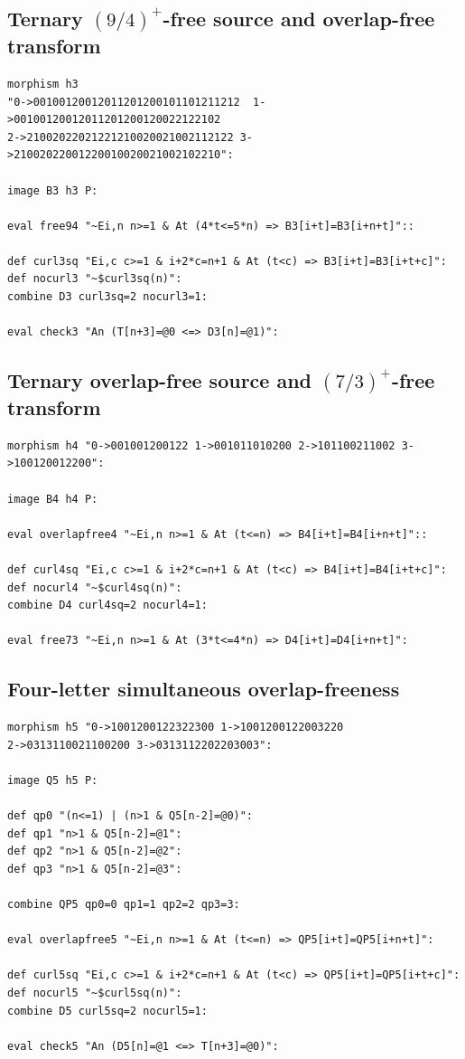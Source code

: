\documentclass[12pt,reqno]{article}
\begin{document}
\subsection{\texorpdfstring{Ternary $(9/4)^+$-free source and overlap-free transform}{Ternary (9/4)+-free source and overlap-free transform}}
\label{app:h3}
\begin{verbatim} 
morphism h3 
"0->00100120012011201200101101211212  1->00100120012011201200120022122102 
2->21002022021221210020021002112122 3->21002022001220010020021002102210":

image B3 h3 P:

eval free94 "~Ei,n n>=1 & At (4*t<=5*n) => B3[i+t]=B3[i+n+t]"::

def curl3sq "Ei,c c>=1 & i+2*c=n+1 & At (t<c) => B3[i+t]=B3[i+t+c]":
def nocurl3 "~$curl3sq(n)":
combine D3 curl3sq=2 nocurl3=1:

eval check3 "An (T[n+3]=@0 <=> D3[n]=@1)": 
\end{verbatim}

\subsection{\texorpdfstring{Ternary overlap-free source and $(7/3)^+$-free transform}{Ternary overlap-free source and (7/3)+-free transform}}
\label{app:h4}
\begin{small}
\begin{verbatim} 
morphism h4 "0->001001200122 1->001011010200 2->101100211002 3->100120012200":

image B4 h4 P:

eval overlapfree4 "~Ei,n n>=1 & At (t<=n) => B4[i+t]=B4[i+n+t]"::

def curl4sq "Ei,c c>=1 & i+2*c=n+1 & At (t<c) => B4[i+t]=B4[i+t+c]":
def nocurl4 "~$curl4sq(n)":
combine D4 curl4sq=2 nocurl4=1:

eval free73 "~Ei,n n>=1 & At (3*t<=4*n) => D4[i+t]=D4[i+n+t]": 
\end{verbatim}
\end{small}

\subsection{Four-letter simultaneous overlap-freeness}
\label{app:h5}
\begin{verbatim} 
morphism h5 "0->1001200122322300 1->1001200122003220 
2->0313110021100200 3->0313112202203003":

image Q5 h5 P:

def qp0 "(n<=1) | (n>1 & Q5[n-2]=@0)": 
def qp1 "n>1 & Q5[n-2]=@1": 
def qp2 "n>1 & Q5[n-2]=@2": 
def qp3 "n>1 & Q5[n-2]=@3":

combine QP5 qp0=0 qp1=1 qp2=2 qp3=3:

eval overlapfree5 "~Ei,n n>=1 & At (t<=n) => QP5[i+t]=QP5[i+n+t]":

def curl5sq "Ei,c c>=1 & i+2*c=n+1 & At (t<c) => QP5[i+t]=QP5[i+t+c]":
def nocurl5 "~$curl5sq(n)":
combine D5 curl5sq=2 nocurl5=1:

eval check5 "An (D5[n]=@1 <=> T[n+3]=@0)": 
\end{verbatim}
\end{document}
